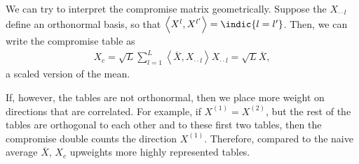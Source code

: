 We can try to interpret the compromise matrix geometrically. Suppose the
$X_{\cdot\cdot l}$ define an orthonormal basis, so that $\left<X^{l},
X^{l^{\prime}}\right> = \indic{l = l^{\prime}}$. Then, we can write the
compromise table as
\begin{align*}
  X_{c} = \sqrt{L}\sum_{l = 1}^{L}\left<\overline{X}, X_{\cdot\cdot
    l}\right>X_{\cdot\cdot l} = \sqrt{L}\overline{X},
\end{align*}
a scaled version of the mean.

If, however, the tables are not orthonormal, then we place more weight on
directions that are correlated. For example, if $X^{(1)} = X^{(2)}$, but the
rest of the tables are orthogonal to each other and to these first two tables,
then the compromise double counts the direction $X^{(1)}$. Therefore, compared
to the naive average $\overline{X}$, $X_c$ upweights more highly represented
tables.
